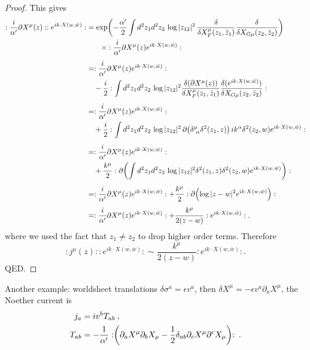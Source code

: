 \begin{tcolorbox}[breakable]
\begin{proof}
	This gives
	\begin{align}
		:\frac{i}{\alpha'}\partial X^\mu(z)::e^{ik\cdot X(w,\bar w)}:
		&=
		\exp\!\left(
		-\frac{\alpha'}{2}
		\int d^2 z_1 d^2 z_2\,
		\log |z_{12}|^2\,
		\frac{\delta}{\delta X_F^\mu(z_1,\bar z_1)}
		\frac{\delta}{\delta X_{G\mu}(z_2,\bar z_2)}
		\right)\notag\\
		&\qquad\times:\frac{i}{\alpha'}\partial X^\mu(z)e^{ik\cdot X(w,\bar w)}:
		\\[1ex]
		&=
		:\frac{i}{\alpha'}\partial X^\mu(z)e^{ik\cdot X(w,\bar w)}:
		\nonumber\\
		&\quad
		-\frac{i}{2}
		:
		\int d^2 z_1 d^2 z_2\,
		\log |z_{12}|^2
		\frac{\delta(\partial X^\mu(z))}{\delta X_F^\mu(z_1,\bar z_1)}
		\frac{\delta(e^{ik\cdot X(w,\bar w)})}{\delta X_{G\mu}(z_2,\bar z_2)}
		:
		\nonumber\\[1ex]
		&=
		:\frac{i}{\alpha'}\partial X^\mu(z)e^{ik\cdot X(w,\bar w)}:
		\nonumber\\
		&\quad
		+\frac{i}{2}
		:
		\int d^2 z_1 d^2 z_2\,
		\log |z_{12}|^2\,
		\partial\!\left(
		\delta^\mu_{\ \alpha}\delta^2(z_1,z)
		\right)
		ik^\alpha \delta^2(z_2,w)
		e^{ik\cdot X(w,\bar w)}
		:
		\nonumber\\[1ex]
		&=
		:\frac{i}{\alpha'}\partial X^\mu(z)e^{ik\cdot X(w,\bar w)}:
		\nonumber\\
		&\quad
		+\frac{k^\mu}{2}
		:
		\partial\!\left(
		\int d^2 z_1 d^2 z_2\,
		\log |z_{12}|^2
		\delta^2(z_1,z)\delta^2(z_2,w)
		e^{ik\cdot X(w,\bar w)}
		\right)
		:
		\nonumber\\[1ex]
		&=
		:\frac{i}{\alpha'}\partial X^\mu(z)e^{ik\cdot X(w,\bar w)}:
		+
		\frac{k^\mu}{2}
		:
		\partial\!\left(
		\log |z-w|^2
		e^{ik\cdot X(w,\bar w)}
		\right)
		:
		\nonumber\\[1ex]
		&=
		:\frac{i}{\alpha'}\partial X^\mu(z)e^{ik\cdot X(w,\bar w)}:
		+
		\frac{k^\mu}{2(z-w)}
		:
		e^{ik\cdot X(w,\bar w)}
		: .
	\end{align}
	where we used the fact that $z_1\ne z_2$ to drop higher order terms. Therefore
	\begin{equation}
		:j^\mu(z)::e^{ik\cdot X(w,\bar w)}:
		\sim
		\frac{k^\mu}{2(z-w)}
		:e^{ik\cdot X(w,\bar w)}: .
	\end{equation}
	QED.
	\end{proof}
\end{tcolorbox}

Another example: worldsheet translations $\delta \sigma^{a}=\epsilon v^{a}$, then $\delta X^{\mu}=-\epsilon v^{a} \partial_{a} X^{\mu}$, the Noether current is    
\begin{subequations}
	\begin{align}
		j_{a}  &=i v^{b} T_{a b} \:, \label{2.3.15a} \\
		T_{a b}&=-\frac{1}{\alpha^{\prime}}:\mathrel{\biggl(\partial_{a} X^{\mu} \partial_{b} X_{\mu}-\frac{1}{2} \delta_{a b} \partial_{c} X^{\mu} \partial^{c} X_{\mu}\biggr)}: \:.
		\label{2.3.15b}
	\end{align}
\end{subequations}

